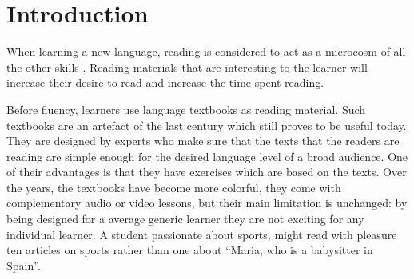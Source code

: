 
\section{Introduction}
When learning a new language, reading is considered to act as a microcosm of all the other skills \cite{mccarthy1999-microcosm}. Reading materials that are interesting to the learner will increase their desire to read and increase the time spent reading.  


Before fluency, learners use language textbooks as reading material. Such textbooks are an artefact of the last century which still proves to be useful today. They are designed by experts who make sure that the texts that the readers are reading are simple enough for the desired language level of a broad audience. One of their advantages is that they have exercises which are based on the texts. Over the years, the textbooks have become more colorful, they come with complementary audio or video lessons, but their main limitation is unchanged: 
by being designed for a average generic learner they are not exciting for any individual learner. A student passionate about sports, might read with pleasure ten articles on sports rather than one about ``Maria, who is a babysitter in Spain''. 


